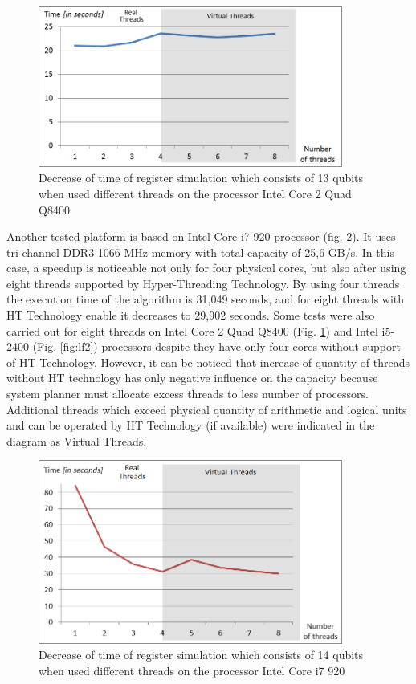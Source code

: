 \documentclass[10pt, a5paper]{article}
\begin{document}
\begin{figure}
  \centering
  \includegraphics[width=10cm]{18_2012_5b.png}
  \caption{Decrease of time of register simulation which consists of 13 qubits when used different threads on the processor Intel Core 2 Quad Q8400}
  \label{fig:lf5}
\end{figure}

Another tested platform is based on Intel Core i7 920 processor (fig. \ref{fig:lf4}). It uses tri-channel DDR3 1066 MHz memory with total capacity of 25,6 GB/s. In this case, a speedup is noticeable not only for four physical cores, but also after using eight threads supported by Hyper-Threading Technology. By using four threads the execution time of the algorithm is 31,049 seconds, and for eight threads with HT Technology enable it decreases to 29,902 seconds. Some tests were also carried out for eight threads on Intel Core 2 Quad Q8400 (Fig. \ref{fig:lf5}) and Intel i5-2400 (Fig. \ref{fig:lf2}) processors despite they have only four cores without support of HT Technology. However, it can be noticed that increase of quantity of threads without HT technology has only negative influence on the capacity because system planner must allocate excess threads to less number of processors. Additional threads which exceed physical quantity of arithmetic and logical units and can be operated by HT Technology (if available) were indicated in the diagram as Virtual Threads.

\begin{figure}
  \centering
  \includegraphics[width=10cm]{18_2012_4b.png}
  \caption{Decrease of time of register simulation which consists of 14 qubits when used different threads on the processor Intel Core i7 920}
  \label{fig:lf4}
\end{figure}
\end{document}
